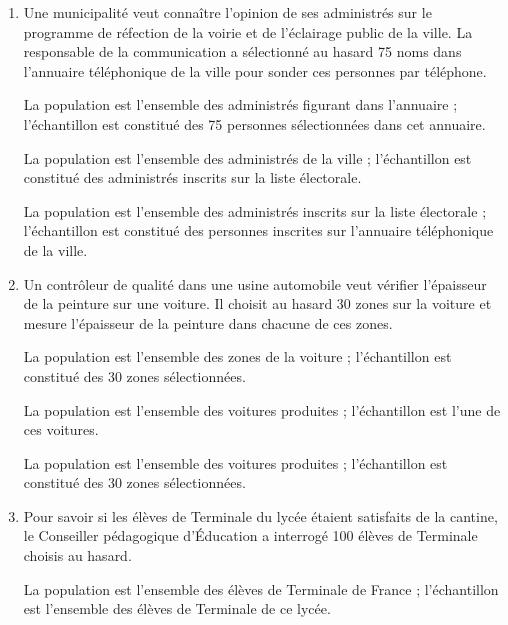 \documentclass[main.tex]{subfiles}
\begin{document}
\begin{solution}
    \begin{enumerate}
        \item Une municipalité veut connaître l'opinion de ses administrés sur le programme de réfection de la voirie et de l'éclairage public de la ville. La responsable de la communication a sélectionné au hasard 75 noms dans l'annuaire téléphonique de la ville pour sonder ces personnes par téléphone.
              \begin{QCM}
                   La population est l'ensemble des administrés figurant dans l'annuaire ; l'échantillon est constitué des 75 personnes sélectionnées dans cet annuaire.

                  \choice La population est l'ensemble des administrés de la ville ; l'échantillon est constitué des administrés inscrits sur la liste électorale.

                  \choice La population est l'ensemble des administrés inscrits sur la liste électorale ; l'échantillon est constitué des personnes inscrites sur l'annuaire téléphonique de la ville.
              \end{QCM}
        \item Un contrôleur de qualité dans une usine automobile veut vérifier l'épaisseur de la peinture sur une voiture. Il choisit au hasard 30 zones sur la voiture et mesure l'épaisseur de la peinture dans chacune de ces zones.
              \begin{QCM}
                   La population est l'ensemble des zones de la voiture ; l'échantillon est constitué des 30 zones sélectionnées.

                  \choice La population est l'ensemble des voitures produites ; l'échantillon est l'une de ces voitures.

                  \choice La population est l'ensemble des voitures produites ; l'échantillon est constitué des 30 zones sélectionnées.
              \end{QCM}
        \item Pour savoir si les élèves de Terminale du lycée étaient satisfaits de la cantine, le Conseiller pédagogique d'Éducation a interrogé 100 élèves de Terminale choisis au hasard.
              \begin{QCM}
                  \choice La population est l'ensemble des élèves de Terminale de France ; l'échantillon est l'ensemble des élèves de Terminale de ce lycée.


\end{QCM}
\end{enumerate}
\end{solution}
\end{document}
